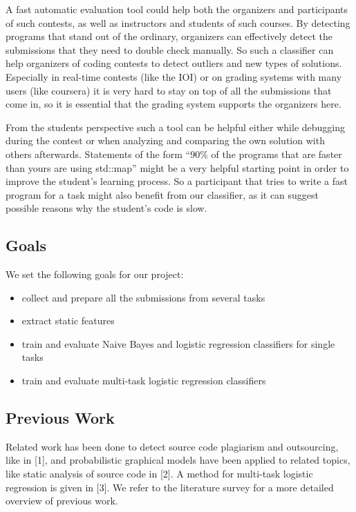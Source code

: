 A fast automatic evaluation tool could help both the organizers and participants of such contests, as well as instructors and students of such courses.
By detecting programs that stand out of the ordinary, organizers can effectively detect the submissions that they need to double check manually.
So such a classifier can help organizers of coding contests to detect outliers and new types of solutions. 
Especially in real-time contests (like the IOI) or on grading systems with many users (like coursera) it is very hard to stay on top of all the submissions that come in, so it is essential that the grading system supports the organizers here.

From the students perspective such a tool can be helpful either while debugging during the contest or when analyzing and comparing the own solution with others afterwards. Statements of the form “90\% of the programs that are faster than yours are using std::map” might be a very helpful starting point in order to improve the student’s learning process. So a participant that tries to write a fast program for a task might also benefit from our classifier, as it can suggest possible reasons why the student's code is slow.

\subsection*{Goals}
We set the following goals for our project:
\begin{itemize}
\item collect and prepare all the submissions from several tasks
\item extract static features 
\item train and evaluate Naive Bayes and logistic regression classifiers for single tasks
\item train and evaluate multi-task logistic regression classifiers
\end{itemize}

\subsection*{Previous Work}
Related work has been done to detect source code plagiarism and outsourcing, like in [1], and probabilistic graphical models have been applied to related topics, like static analysis of source code in [2]. 
A method for multi-task logistic regression is given in [3].
We refer to the literature survey for a more detailed overview of previous work.
